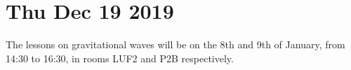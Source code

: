 \documentclass[main.tex]{subfiles}
\begin{document}
\section*{Thu Dec 19 2019}

The lessons on gravitational waves will be on the 8th and 9th of January, from 14:30 to 16:30, in rooms LUF2 and P2B respectively. 
\end{document}
